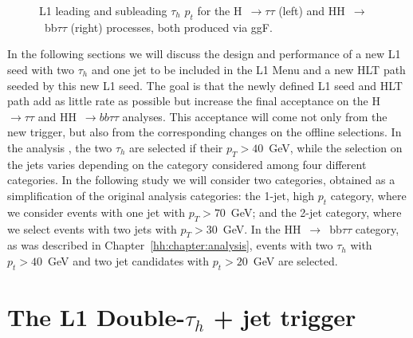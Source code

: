 \documentclass[../main.tex]{subfiles}
\begin{document}
\begin{figure}[h!]
\begin{center}
\end{center}
\caption{L1 leading and subleading $\tau_h$ $p_t$ for the H~$\to\tau\tau$ (left) and HH~$\to$~bb$\tau\tau$ (right) processes, both produced via ggF.}
\label{hh:fig:trig_l1tau_pt}
\end{figure}

In the following sections we will discuss the design and performance of a new L1 seed with two $\tau_h$ and one jet to be included in the L1 Menu and a new HLT path seeded by this new L1 seed. The goal is that the newly defined L1 seed and HLT path add as little rate as possible but increase the final acceptance on the H~$\to\tau\tau$ and HH~$\to bb\tau\tau$ analyses. This acceptance will come not only from the new trigger, but also from the corresponding changes on the offline selections. In the \htt{} analysis \cite{hh:htt_run2}, the two $\tau_h$ are selected if their $p_T > 40$~GeV, while the selection on the jets varies depending on the category considered among four different categories. In the following study we will consider two categories, obtained as a simplification of the original analysis categories: the 1-jet, high $p_t$ category, where we consider events with one jet with $p_T > 70$~GeV; and the 2-jet category, where we select events with two jets with $p_T > 30$~GeV. In the HH~$\to$~bb$\tau\tau$ category, as was described in Chapter~\ref{hh:chapter:analysis}, events with two $\tau_h$ with $p_t>40$~GeV and two jet candidates with $p_t>20$~GeV are selected.



\section{The L1 Double-$\tau_h$ + jet trigger}
\label{hh:sec:l1seeds}
\end{document}
